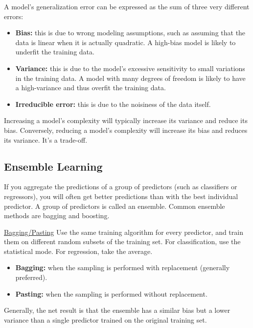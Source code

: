 A model's generalization error can be expressed as the sum of three very different errors:
\vspace{-3.0mm}
\begin{itemize}
\item
\textbf{Bias:}
this is due to wrong modeling assumptions, such as assuming that the data is linear when it is actually quadratic.
A high-bias model is likely to underfit the training data.
\item
\textbf{Variance:}
this is due to the model's excessive sensitivity to small variations in the training data.
A model with many degrees of freedom is likely to have a high-variance and thus overfit the training data.
\item
\textbf{Irreducible error:}
this is due to the noisiness of the data itself.
\end{itemize}

Increasing a model's complexity will typically increase its variance and reduce its bias.\newline
Conversely, reducing a model's complexity will increase its bias and reduces its variance.\newline
It's a trade-off.

\subsection{Ensemble Learning}

If you aggregate the predictions of a group of predictors (such as classifiers or regressors),
you will often get better predictions than with the best individual predictor.
% 
A group of predictors is called an ensemble.
Common ensemble methods are bagging and boosting.\newline

\underline{Bagging/Pasting}\newline
Use the same training algorithm for every predictor,
and train them on different random subsets of the training set.
For classification, use the statistical mode.
For regression, take the average.
\vspace{-3.0mm}
\begin{itemize}
\item
\textbf{Bagging:} when the sampling is performed with replacement (generally preferred).
\item
\textbf{Pasting:} when the sampling is performed without replacement.
\end{itemize}
%
\vspace{-3.0mm}
Generally, the net result is that the ensemble has a similar bias but a lower variance
than a single predictor trained on the original training set.

